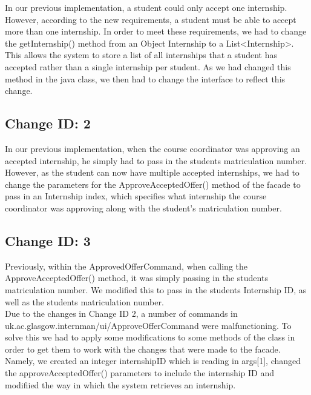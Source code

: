 \documentclass{l3deliverable}
\begin{document}
In our previous implementation, a student could only accept one internship. However, according to the new requirements, a student must be able to accept more than one internship. In order to meet these requirements, we had to change the getInternship() method from an Object Internship to a List<Internship>. This allows the system to store a list of all internships that a student has accepted rather than a single internship per student. As we had changed this method in the java class, we then had to change the interface to reflect this change.\\

\subsection{Change ID: 2}

In our previous implementation, when the course coordinator was approving an accepted internship, he simply had to pass in the students matriculation number. However, as the student can now have multiple accepted internships, we had to change the parameters for the ApproveAcceptedOffer() method of the facade to pass in an Internship index, which specifies what internship the course coordinator was approving along with the student's matriculation number.

\subsection{Change ID: 3}

Previously, within the ApprovedOfferCommand, when calling the ApproveAcceptedOffer() method, it was simply passing in the students matriculation number. We modified this to pass in the students Internship ID, as well as the students matriculation number. \\
Due to the changes in Change ID 2, a number of commands in uk.ac.glasgow.internman/ui/ApproveOfferCommand were malfunctioning. To solve this we had to apply some modifications to some methods of the class in order to get them to work with the changes that were made to the facade. Namely, we created an integer internshipID which is reading in args[1], changed the approveAcceptedOffer() parameters to include the internship ID and modifiied the way in which the system retrieves an internship.\\
\end{document}
